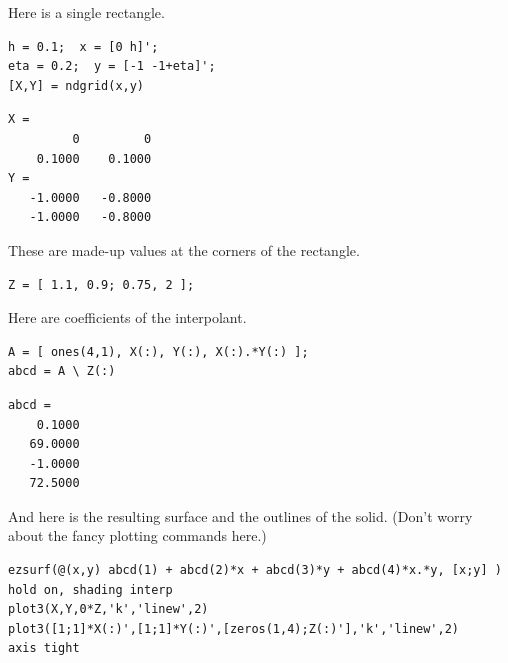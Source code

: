 











\setlength{\parindent}{0pt}



    
    \vspace{1em}\begin{par}
Here is a single rectangle.
\end{par} 
\begin{lstlisting}
h = 0.1;  x = [0 h]';
eta = 0.2;  y = [-1 -1+eta]';
[X,Y] = ndgrid(x,y)
\end{lstlisting}

\color[rgb]{0.4,0,0}  \begin{lstlisting}
X =
         0         0
    0.1000    0.1000
Y =
   -1.0000   -0.8000
   -1.0000   -0.8000

\end{lstlisting} \color{black} \vspace{1ex}
    \vspace{1em}\begin{par}
These are made-up values at the corners of the rectangle.
\end{par} 
\begin{lstlisting}
Z = [ 1.1, 0.9; 0.75, 2 ];
\end{lstlisting}
\vspace{1em}\begin{par}
Here are coefficients of the interpolant.
\end{par} 
\begin{lstlisting}
A = [ ones(4,1), X(:), Y(:), X(:).*Y(:) ];   
abcd = A \ Z(:)
\end{lstlisting}

\color[rgb]{0.4,0,0}  \begin{lstlisting}
abcd =
    0.1000
   69.0000
   -1.0000
   72.5000

\end{lstlisting} \color{black} \vspace{1ex}
    \vspace{1em}\begin{par}
And here is the resulting surface and the outlines of the solid. (Don't worry about the fancy plotting commands here.)
\end{par} 
\begin{lstlisting}
ezsurf(@(x,y) abcd(1) + abcd(2)*x + abcd(3)*y + abcd(4)*x.*y, [x;y] )
hold on, shading interp
plot3(X,Y,0*Z,'k','linew',2)
plot3([1;1]*X(:)',[1;1]*Y(:)',[zeros(1,4);Z(:)'],'k','linew',2)
axis tight
\end{lstlisting}

